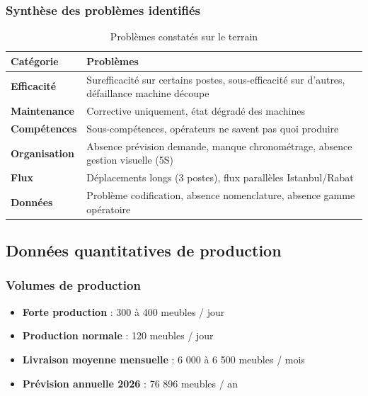 \documentclass[12pt,a4paper]{article}
\begin{document}
\begin{center}
\subsubsection{Synthèse des problèmes identifiés}

\begin{table}[H]
\centering
\caption{Problèmes constatés sur le terrain}
\label{tab:ynion_problemes}
\begin{tabular}{|p{3.5cm}|p{8.5cm}|}
\hline
\textbf{Catégorie} & \textbf{Problèmes} \\ \hline
\textbf{Efficacité} & Surefficacité sur certains postes, sous-efficacité sur d'autres, défaillance machine découpe \\ \hline
\textbf{Maintenance} & Corrective uniquement, état dégradé des machines \\ \hline
\textbf{Compétences} & Sous-compétences, opérateurs ne savent pas quoi produire \\ \hline
\textbf{Organisation} & Absence prévision demande, manque chronométrage, absence gestion visuelle (5S) \\ \hline
\textbf{Flux} & Déplacements longs (3 postes), flux parallèles Istanbul/Rabat \\ \hline
\textbf{Données} & Problème codification, absence nomenclature, absence gamme opératoire \\ \hline
\end{tabular}
\end{table}

\subsection{Données quantitatives de production}

\subsubsection{Volumes de production}

\begin{itemize}
    \item \textbf{Forte production} : 300 à 400 meubles / jour
    \item \textbf{Production normale} : 120 meubles / jour
    \item \textbf{Livraison moyenne mensuelle} : 6 000 à 6 500 meubles / mois
    \item \textbf{Prévision annuelle 2026} : 76 896 meubles / an
\end{itemize}


\end{center}
\end{document}
